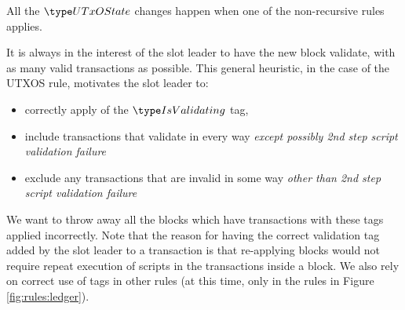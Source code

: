 All the $\UTxOState$ changes happen when one of the non-recursive rules
applies.

It is always in the interest of the slot leader to have the new block validate,
with as many valid transactions as possible. This general heuristic,
in the case of the UTXOS rule, motivates the
slot leader to:

\begin{itemize}
  \item correctly apply of the $\IsValidating$ tag,
  \item include transactions that validate in every way
  \textit{except possibly 2nd step script validation failure}
  \item exclude any transactions that are invalid
in some way \textit{other than 2nd step script validation failure}
\end{itemize}

We want to
throw away all the blocks which have transactions with these tags
applied incorrectly.
Note that the reason for having the correct validation tag added by the slot leader
to a transaction is that re-applying blocks would not require repeat
execution of scripts in the transactions inside a block.
We also rely on correct use of tags in other rules (at this time, only in
the rules in Figure \ref{fig:rules:ledger}).

